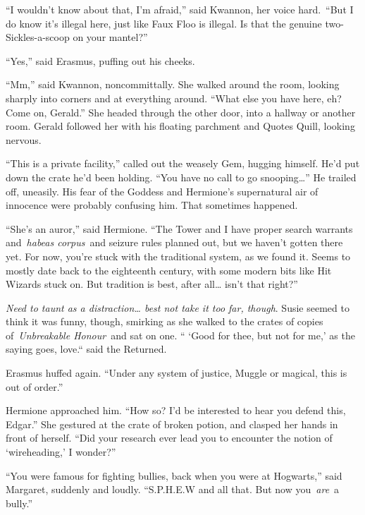 ``I wouldn't know about that, I'm afraid,'' said Kwannon, her voice
hard.~``But I do know it's illegal here, just like Faux Floo is illegal.
Is that the genuine two-Sickles-a-scoop on your mantel?''

``Yes,'' said Erasmus, puffing out his cheeks.

``Mm,'' said Kwannon, noncommittally. She walked around the room,
looking sharply into corners and at everything around. ``What else you
have here, eh? Come on, Gerald.'' She headed through the other door,
into a hallway or another room. Gerald followed her with his floating
parchment and Quotes Quill, looking nervous.

``This is a private facility,'' called out the weasely Gem, hugging
himself. He'd put down the crate he'd been holding. ``You have no call
to go snooping\ldots{}'' He trailed off, uneasily. His fear of the
Goddess and Hermione's supernatural air of innocence were probably
confusing him. That sometimes happened.

``She's an auror,'' said Hermione. ``The Tower and I have proper search
warrants and~\emph{habeas corpus}~and seizure rules planned out, but we
haven't gotten there yet. For now, you're stuck with the traditional
system, as we found it. Seems to mostly date back to the eighteenth
century, with some modern bits like Hit Wizards stuck on. But tradition
is best, after all\ldots{} isn't that right?''

\emph{Need to taunt as a distraction\ldots{} best not take it too far,
though}. Susie seemed to think it was funny, though, smirking as she
walked to the crates of copies of~\emph{Unbreakable Honour}~and sat on
one. `` `Good for thee, but not for me,' as the saying goes, love.``
said the Returned.

Erasmus huffed again. ``Under any system of justice, Muggle or magical,
this is out of order.''

Hermione approached him. ``How so? I'd be interested to hear you defend
this, Edgar.'' She gestured at the crate of broken potion, and clasped
her hands in front of herself. ``Did your research ever lead you to
encounter the notion of `wireheading,' I wonder?''

``You were famous for fighting bullies, back when you were at
Hogwarts,'' said Margaret, suddenly and loudly. ``S.P.H.E.W and all
that. But now you~\emph{are}~a bully.''

